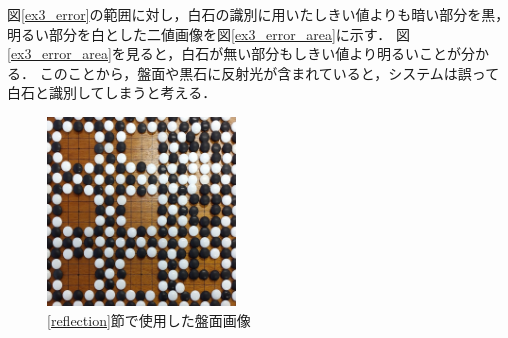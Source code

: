\documentclass[summary]{nitocs}
\numberwithin{equation}{section}
\begin{document}
            図\ref{ex3_error}の範囲に対し，白石の識別に用いたしきい値よりも暗い部分を黒，明るい部分を白とした二値画像を図\ref{ex3_error_area}に示す．
            図\ref{ex3_error_area}を見ると，白石が無い部分もしきい値より明るいことが分かる．
            このことから，盤面や黒石に反射光が含まれていると，システムは誤って白石と識別してしまうと考える．
            \begin{figure}[tb] %
                \begin{center}
                \includegraphics[clip,width=50mm]{DSC_0098/boardImg.jpg} 
                \caption{\ref{reflection}節で使用した盤面画像}
                \label{ex3_img}
                \end{center}
            \end{figure}
\end{document}
